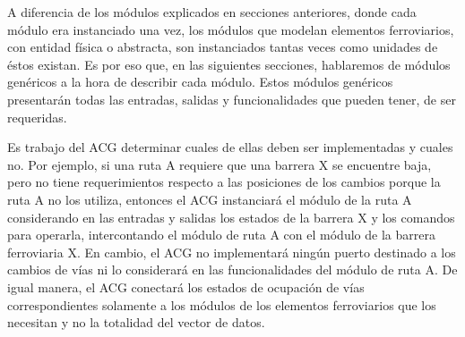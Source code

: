 	A diferencia de los módulos explicados en secciones anteriores, donde cada módulo era instanciado una vez, los módulos que modelan elementos ferroviarios, con entidad física o abstracta, son instanciados tantas veces como unidades de éstos existan. Es por eso que, en las siguientes secciones, hablaremos de módulos genéricos a la hora de describir cada módulo. Estos módulos genéricos presentarán todas las entradas, salidas y funcionalidades que pueden tener, de ser requeridas. 
	
	Es trabajo del ACG determinar cuales de ellas deben ser implementadas y cuales no. Por ejemplo, si una ruta A requiere que una barrera X se encuentre baja, pero no tiene requerimientos respecto a las posiciones de los cambios porque la ruta A no los utiliza, entonces el ACG instanciará el módulo de la ruta A considerando en las entradas y salidas los estados de la barrera X y los comandos para operarla, intercontando el módulo de ruta A con el módulo de la barrera ferroviaria X. En cambio, el ACG no implementará ningún puerto destinado a los cambios de vías ni lo considerará en las funcionalidades del módulo de ruta A. De igual manera, el ACG conectará los estados de ocupación de vías correspondientes solamente a los módulos de los elementos ferroviarios que los necesitan y no la totalidad del vector de datos.
	
	
	
	
	
	
	
	
